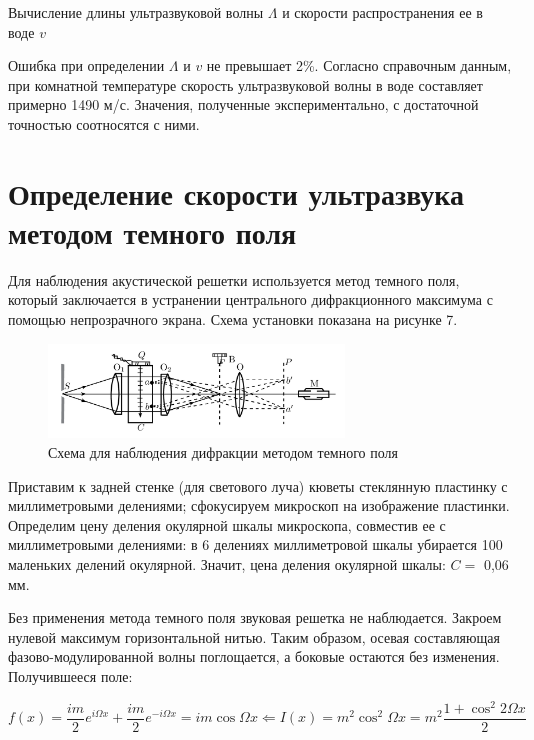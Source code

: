\documentclass[12pt]{article}
\begin{document}
	\begin{table}[H]
	\centering
	
	\caption{Вычисление длины ультразвуковой волны $ \Lambda $ и скорости распространения ее в воде $ v $}
	\label{speed}
\end{table}

\newpage

Ошибка при определении $ \Lambda $ и $ v $ не превышает 2\%. Согласно справочным данным, при комнатной температуре скорость ультразвуковой волны в воде составляет примерно 1490 м/с. Значения, полученные экспериментально, с достаточной точностью соотносятся с ними.

\newpage

\section{Определение скорости ультразвука методом темного поля}

Для наблюдения акустической решетки используется метод темного поля, который заключается в устранении центрального дифракционного максимума с помощью непрозрачного экрана. Схема установки показана на рисунке 7.

	\begin{figure}[H]
	\centering
	\includegraphics[width=0.7\textwidth]{shema2.png}
	\caption{Схема для наблюдения дифракции методом темного поля}
	\label{shema2}
\end{figure}

Приставим к задней стенке (для светового луча) кюветы стеклянную пластинку с миллиметровыми делениями; сфокусируем микроскоп на изображение пластинки. Определим цену деления окулярной шкалы микроскопа, совместив ее с миллиметровыми делениями: в 6 делениях миллиметровой шкалы убирается 100 маленьких делений окулярной. Значит, цена деления окулярной шкалы: $ C = $ 0,06 мм.

Без применения метода темного поля звуковая решетка не наблюдается. Закроем нулевой максимум горизонтальной нитью. Таким образом, осевая составляющая фазово-модулированной волны поглощается, а боковые остаются без изменения. Получившееся поле:

\begin{equation}\label{}
f(x) = \frac{im}{2} e^{i\Omega x} +  \frac{im}{2} e^{-i\Omega x} = im \cos \Omega x \Leftarrow I(x) = m^2 \cos ^2 \Omega x = m^2 \frac{1 + \cos ^2 2 \Omega x}{2}
\end{equation}
\end{document}
